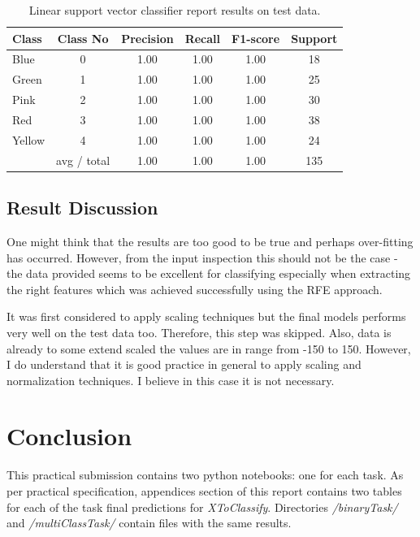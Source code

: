 \documentclass[11pt]{article}
\begin{document}
			\begin{center}
			  	\begin{table}[h]
			  	\centering
				\begin{tabular}[b]{| l | c | c | c | c | c |}
					\hline
					Class & Class No & Precision &  Recall & F1-score & Support  \\
		 			\hline
					Blue  & 0  &   1.00   &   1.00   &   1.00   &   18 \\
          			Green & 1  &   1.00   &   1.00   &   1.00   &   25 \\
         			Pink  & 2  &   1.00   &   1.00   &   1.00   &   30 \\
          			Red  & 3  &   1.00   &   1.00   &   1.00   &   38 \\
          			Yellow & 4  &   1.00   &   1.00   &   1.00   &  24 \\
          			\hline
					 & avg / total   &   1.00   &   1.00   &   1.00  &  135 \\
					\hline
				\end{tabular}
				\caption{Linear support vector classifier report results on test data.}
				\label{tbl:vector_resuts_multi_testing}
				\end{table}
			\end{center}
			\vspace*{-1.3cm}

		\subsection{Result Discussion}
			One might think that the results are too good to be true and perhaps over-fitting has occurred. However, from the input inspection this should not be the case - the data provided seems to be excellent for classifying especially when extracting the right features which was achieved successfully using the RFE approach. 

			It was first considered to apply scaling techniques but the final models performs very well on the test data too. Therefore, this step was skipped. Also, data is already to some extend scaled the values are in range from -150 to 150. However, I do understand that it is good practice in general to apply scaling and normalization techniques. I believe in this case it is not necessary. 

	\section{Conclusion}
		This practical submission contains two python notebooks: one for each task. As per practical specification, appendices section of this report contains two tables for each of the task final predictions for \textit{XToClassify}. Directories \textit{/binaryTask/} and \textit{/multiClassTask/} contain files with the same results. 
\end{document}
